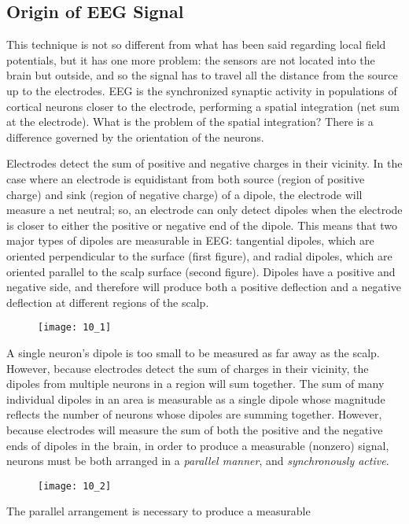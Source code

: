\subsection{Origin of EEG Signal}
This technique is not so different from what has been said regarding local field potentials, but it has one more problem: the sensors 
are not located into the brain but outside, and so the signal has to travel all the distance from the source up to the electrodes.
EEG is the synchronized synaptic activity in populations of cortical neurons closer to the electrode, performing a spatial integration 
(net sum at the electrode).
What is the problem of the spatial integration? There is a difference governed by the orientation of the neurons.
\par\medskip
Electrodes detect the sum of positive and negative charges in their vicinity. In the case where an electrode is equidistant from
both source (region of positive charge) and sink (region of negative charge) of a dipole, the electrode will measure a net
neutral; so, an electrode can only detect dipoles when the electrode is closer to either the positive or negative end of the dipole. 
This means that two major types of dipoles are measurable in EEG: tangential dipoles, which are oriented perpendicular to
the surface (first figure), and radial dipoles, which are oriented parallel to the scalp surface (second figure). Dipoles have a 
positive and negative side, and therefore will produce both a positive deflection and a negative deflection at different regions of the scalp.
\begin{figure}[H]
    \texttt{[image: 10\_1]}
    \centering
\end{figure}
A single neuron's dipole is too small to be measured as far away as the scalp. However, because electrodes detect the sum of charges
in their vicinity, the dipoles from multiple neurons in a region will sum together. The sum of many individual dipoles in an area is
measurable as a single dipole whose magnitude reflects the number of neurons whose dipoles are summing together. However, because electrodes 
will measure the sum of both the positive and the negative ends of dipoles in the brain, in order to produce a measurable (nonzero) signal, 
neurons must be both arranged in a \textit{parallel manner}, and \textit{synchronously active}. 
\begin{figure}[H]
    \texttt{[image: 10\_2]}
    \centering
\end{figure}
The parallel arrangement is necessary to produce a measurable 
